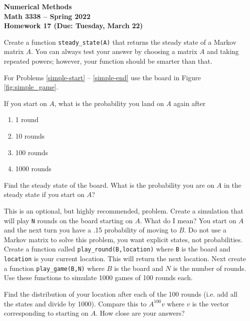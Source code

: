 \documentclass[11pt,letterpaper]{article}
\newcommand{\semester}{Spring 2022}
\newcommand{\due}{Tuesday, March 22}
\begin{document}
\begin{center}
{\huge{\bf  Numerical Methods}} \\[1.5ex]
{\bf Math 3338 -- \semester}\\[1.5ex]
{\Large{\bf Homework 17 (Due: \due)}}\\
\end{center}
\vspace{2mm}

\begin{problem}
 Create a function \texttt{steady\_state(A)} that returns the steady state of a Markov matrix $A$. You can always test your answer by choosing a matrix $A$ and taking repeated powers; however, your function should be smarter than that. 
\end{problem}


For Problems \ref{simple-start} -- \ref{simple-end} use the board in Figure \ref{fig:simple_game}.

\begin{problem}
 \label{simple-start}
 If you start on $A$, what is the probability you land on $A$ again after
 \begin{enumerate}
  \item 1 round
  \item 10 rounds
  \item 100 rounds
  \item 1000 rounds
 \end{enumerate}
\end{problem}

\begin{problem}
 Find the steady state of the board. What is the probability you are on $A$ in the steady state if you start on $A$?
\end{problem}


\begin{problem}
 \label{simple-end}
 This is an optional, but highly recommended, problem. Create a simulation that will play \texttt{N} rounds on the board starting on $A$. What do I mean? You start on $A$ and the next turn you have a .15 probability of moving to $B$. Do not use a Markov matrix to solve this problem, you want explicit states, not probabilities. Create a function called \texttt{play\_round(B,location)} where \texttt{B} is the board and \texttt{location} is your current location. This will return the next location. Next create a function \texttt{play\_game(B,N)} where $B$ is the board and $N$ is the number of rounds. Use these functions to simulate 1000 games of 100 rounds each. 
 
 Find the distribution of your location after each of the 100 rounds (i.e. add all the states and divide by 1000). Compare this to $A^{100}v$ where $v$ is the vector corresponding to starting on $A$. How close are your answers? 
\end{problem}
\end{document}
